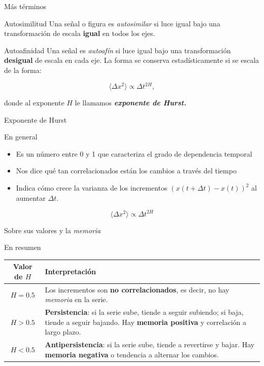 \documentclass[11pt]{beamer}
\begin{document}
\begin{frame}{Más términos}
\begin{block}{Autosimilitud}
Una señal o figura es \textit{autosimilar} si luce igual bajo una transformación de escala \textbf{igual} en todos los ejes.
\end{block}

\begin{block}{Autoafinidad}
Una señal es \textit{autoafín} si luce igual bajo una transformación \textbf{desigual} de escala en cada eje. La forma se conserva estadísticamente si se escala de la forma:

\begin{equation}
\langle \Delta x^2 \rangle \propto \Delta t^{2H},
\end{equation}

donde al exponente $H$ le llamamos \textbf{\textit{exponente de Hurst.}}
\end{block}

\end{frame}

\begin{frame}{Exponente de Hurst}
\begin{block}{En general}
\begin{itemize}
	\item Es un número entre 0 y 1 que caracteriza el grado de dependencia temporal 
	\item Nos dice qué tan correlacionados están los cambios a través del tiempo
	\item Indica cómo crece la varianza de los incrementos $(x(t+\Delta t)-x(t))^2$ al aumentar $\Delta t$.
	
\end{itemize}
\medskip
$$
\langle \Delta x^2 \rangle \propto \Delta t^{2H}
$$
\end{block}
\end{frame}

\begin{frame}{Sobre sus valores y la \textit{memoria}}
\begin{block}{En resumen}
\begin{center}
\small
\begin{tabular}{|c|p{6cm}|}
\hline
\textbf{Valor de \( H \)} & \textbf{Interpretación} \\
\hline
\( H = 0.5 \) & Los incrementos son \textbf{no correlacionados}, es decir, no hay \textit{memoria} en la serie.\\
\hline
\( H > 0.5 \) & \textbf{Persistencia}: si la serie sube, tiende a seguir subiendo; si baja, tiende a seguir bajando. Hay \textbf{memoria positiva} y correlación a largo plazo.\\
\hline
\( H < 0.5 \) & \textbf{Antipersistencia}: si la serie sube, tiende a revertirse y bajar. Hay \textbf{memoria negativa} o tendencia a alternar los cambios.\\
\hline
\end{tabular}
\end{center}
\end{block}

\end{frame}
\end{document}
